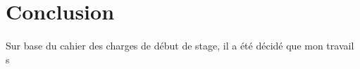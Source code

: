 \documentclass{article}
\begin{document}

    \newpage
    \section*{Conclusion}
    \paragraph{}
    Sur base du cahier des charges de début de stage, il a été décidé que mon travail s

    \newpage
     
    

    
\end{document}

